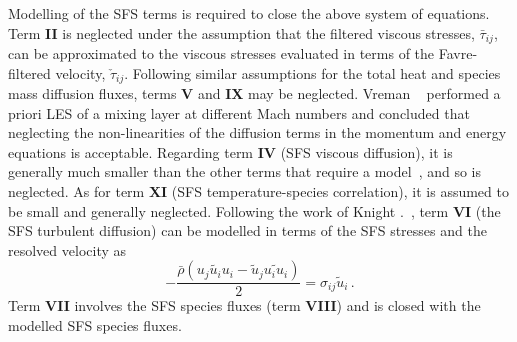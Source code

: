 Modelling of the SFS terms is required to close the above system of equations. Term \textbf{II} is neglected under the assumption that the filtered viscous stresses, $\bar{\tau}_{ij}$, can be approximated to the viscous stresses evaluated in terms of the Favre-filtered velocity, $\check{\tau}_{ij}$. Following similar assumptions for the total heat and species mass diffusion fluxes, terms \textbf{V} and
\textbf{IX} may be neglected. Vreman \etal ~\cite{vreman:1995} performed a priori LES of a mixing layer at different Mach numbers and concluded that neglecting the non-linearities of the diffusion terms in the momentum and energy equations is acceptable. Regarding term \textbf{IV} (SFS viscous diffusion), it is generally much smaller than the other terms that require a model~\cite{martin:2000}, and so is neglected. As for term \textbf{XI} (SFS temperature-species correlation), it is assumed to be small and generally neglected.
%
Following the work of Knight \etal.~\cite{knight:1998}, term \textbf{VI} (the SFS turbulent diffusion) can be modelled in terms of the SFS stresses and the resolved velocity as
%
\begin{equation}
  - \frac{\bar{\rho} \left(\widetilde{u_j u_i u_i} - \tilde{u}_j\widetilde{u_i u_i} \right)}{2} 
  = \sigma_{ij}\tilde{u}_i \,.
\end{equation}
%
Term \textbf{VII} involves the SFS species fluxes (term \textbf{VIII}) and is closed with the modelled SFS species fluxes. 